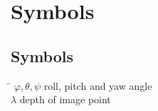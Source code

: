 \chapter*{Symbols}
\label{sec:symbols}

\section*{Symbols}

\begin{tabbing}
 \hspace*{1.6cm} \= \kill
  $\varphi, \theta, \psi$    \> roll, pitch and yaw angle \\[0.5ex] 								
  $\lambda$                  \> depth of image point \\[0.5ex] 		
	
		
   		
\end{tabbing}

